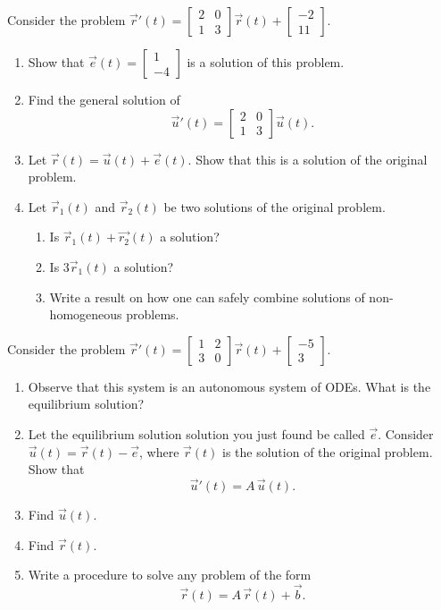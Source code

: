 \begin{exercises}
\begin{problist}
	\prob Consider the problem $\vec{r}'(t) = \begin{bmatrix} 2 & 0 \\ 1 & 3 \end{bmatrix} \vec{r}(t) + \begin{bmatrix} -2 \\ 11 \end{bmatrix}$.
	\begin{enumerate}
		\item Show that $\vec{e}(t) = \begin{bmatrix} 1 \\ -4 	\end{bmatrix}$ is a solution of this problem.
		\item Find the general solution of 
		$$\vec{u}'(t) = \begin{bmatrix} 2 & 0 \\ 1 & 3 \end{bmatrix} \vec{u}(t).$$
		\item Let $\vec{r}(t) = \vec{u}(t) + \vec{e}(t)$. Show that this is a solution of the original problem.
		\item Let $\vec{r}_1(t)$ and $\vec{r}_2(t)$ be two solutions of the original problem. 
		\begin{enumerate}
			\item Is $\vec{r}_1(t) + \vec{r_2}(t)$ a solution? 
			\item Is $3\vec{r}_1(t) $ a solution? 
			\item Write a result on how one can safely combine solutions of non-homogeneous problems.
		\end{enumerate}
	\end{enumerate}

	
	\prob \label{prob:sys-nonhomogeneous}Consider the problem  \quad $\vec{r}'(t) = \begin{bmatrix} 1 & 2 \\ 3 & 0 \end{bmatrix}
 \vec{r}(t)+\begin{bmatrix} -5 \\ 3 \end{bmatrix}
$.
	\begin{enumerate}
		\item Observe that this system is an autonomous system of ODEs. What is the equilibrium solution? 
		\item Let the equilibrium solution solution you just found be called $\vec{e}$. Consider $\vec{u}(t) = \vec{r}(t) - \vec{e}$, where $\vec{r}(t)$ is the solution of the original problem. Show that 
			$$ \vec{u}'(t) = A \, \vec{u}(t).$$
		\item Find $\vec{u}(t)$.
		\item Find $\vec{r}(t)$.
		\item Write a procedure to solve any problem of the form
			$$ \vec{r}(t) = A \, \vec{r}(t) + \vec{b}. $$
	\end{enumerate}
	

\end{problist}
\end{exercises}
